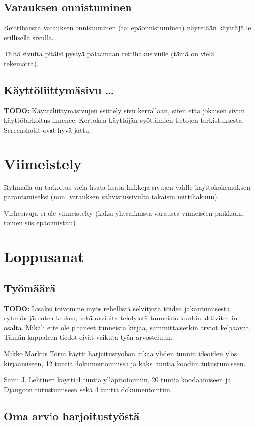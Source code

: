 \documentclass[a4paper,twoside,titlepage,12pt]{article}
\begin{document}
\subsection{Varauksen onnistuminen}

Reittihausta varauksen onnistuminen (tai epäonnistuminen) näytetään
käyttäjälle erillisellä sivulla.

Tältä sivulta pitäisi pystyä palaamaan rettihakusivulle (tämä on vielä
tekemättä).

\subsection{Käyttöliittymäsivu \ldots}
\textbf{TODO:} Käyttöliittymäsivujen esittely sivu kerrallaan, siten että jokaisen sivun käyttötarkoitus ilmenee. Kertokaa käyttäjän syöttämien tietojen tarkistuksesta. Screenshotit ovat hyvä juttu. 

\section{Viimeistely}

Ryhmällä on tarkoitus vielä lisätä lisätä linkkejä sivujen välille
käyttökokemuksen parantamiseksi (mm. varauksen vahvistussivulta takaisin
reittihakuun).

Virhesivuja ei ole viimeistelty (kaksi yhtäaikaista varausta viimeiseen
paikkaan, toinen siis epäonnistuu).

\section{Loppusanat}
\subsection{Työmäärä}
\textbf{TODO:} Lisäksi toivomme myös rehellistä selvitystä töiden jakautumisesta ryhmän jäsenten kesken, sekä arvioita tehdyistä tunneista kunkin aktiviteetin osalta. Mikäli ette ole pitäneet tunneista kirjaa, summittaisetkin arviot kelpaavat. Tämän kappaleen tiedot eivät vaikuta työn arvosteluun.

Mikko Markus Torni käytti harjoitustyöhön aikaa yhden tunnin ideoiden ylös kirjaamiseen, 12 tuntia dokumentoinnissa ja kaksi tuntia koodiin tutustumiseen.

Sami J. Lehtinen käytti 4 tuntia ylläpitotoimiin, 20 tuntia koodaamiseen
ja Djangoon tutustumiseen sekä 4 tuntia dokumentointiin.

\subsection{Oma arvio harjoitustyöstä}
\end{document}
